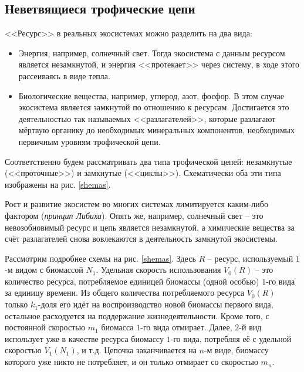 \subsection{Неветвящиеся трофические цепи}
<<Ресурс>> в реальных экосистемах можно разделить на два вида:
\begin{itemize}
    \item Энергия, например, солнечный свет. Тогда экосистема с данным ресурсом является незамкнутой, и энергия <<протекает>> через систему, в ходе этого рассеиваясь в виде тепла.
    \item Биологические вещества, например, углерод, азот, фосфор. В этом случае экосистема является замкнутой по отношению к ресурсам. Достигается это деятельностью так называемых <<разлагателей>>, которые разлагают мёртвую органику до необходимых минеральных компонентов, необходимых первичным уровням трофической цепи.
\end{itemize}

Соответственно будем рассматривать два типа трофической цепей: незамкнутые (<<проточные>>) и замкнутые (<<циклы>>). Схематически оба эти типа изображены на рис. \ref{shemas}.

Рост и развитие экосистем во многих системах лимитируется каким-либо фактором (\textit{принцип Либиха}). Опять же, например, солнечный свет -- это невозобновимый ресурс и цепь является незамкнутой, а химические вещества за счёт разлагателей снова вовлекаются в деятельность замкнутой экосистемы.

Рассмотрим подробнее схемы на рис. \ref{shemas}. Здесь \(R\) -- ресурс, используемый \(1\)-м видом с биомассой \(N_1\). Удельная скорость использования \(V_0(R)\) -- это количество ресурса, потребляемое единицей биомассы (одной особью) \(1\)-го вида за единицу времени. Из общего количества потребляемого ресурса \(V_0(R)\) только \(k_1\)-доля его идёт на воспроизводство новой биомассы первого вида, остальное расходуется на поддержание жизнедеятельности. Кроме того, с постоянной скоростью \(m_1\) биомасса \(1\)-го вида отмирает. Далее, \(2\)-й вид использует уже в качестве ресурса биомассу \(1\)-го вида, потребляя её с удельной скоростью \(V_1(N_1)\), и т.д. Цепочка заканчивается на \(n\)-м виде, биомассу которого уже никто не потребляет, и он только отмирает со скоростью \(m_n\).

